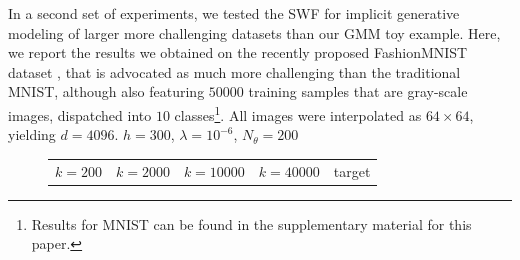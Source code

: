 In a second set of experiments, we tested the SWF for implicit generative modeling of larger more challenging datasets than our GMM toy example. Here, we report the results we obtained on the recently proposed FashionMNIST dataset \cite{xiao2017fashion}, that is advocated as much more challenging than the traditional MNIST, although also featuring $50000$ training samples that are gray-scale images, dispatched into $10$ classes\footnote{Results for MNIST can be found in the supplementary material for this paper.}. All images were interpolated as $64\times 64$, yielding $d=4096$. $h=300$, $\lambda=10^{-6}$, $N_\theta=200$

\begin{figure}
\begin{centering}
  \setlength\tabcolsep{1pt}

\begin{tabular}{cccc|c}
$k=200$ & $k=2000$ & $k=10000$ & $k=40000$ & target\tabularnewline

\end{tabular}
\end{centering}
\end{figure}
